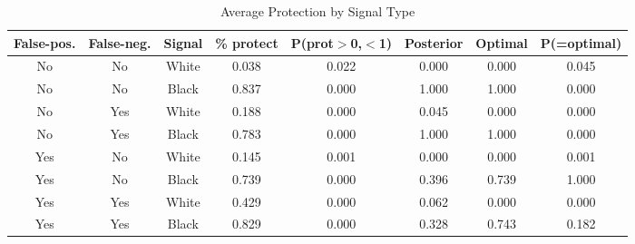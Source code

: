 \begin{table}[H]\centering \footnotesize \caption{Average Protection by Signal Type} \begin{tabular}{cccccccc} \hline \hline
\textbf{False-pos.}&\textbf{False-neg.}&\textbf{Signal}&\textbf{\% protect}& \textbf{P(prot$>$0,$<$1)}& \textbf{Posterior} & \textbf{Optimal} & \textbf{P(=optimal)} \\ \hline
No&No&White&0.038&0.022&0.000&0.000&0.045\\
No&No&Black&0.837&0.000&1.000&1.000&0.000\\
No&Yes&White&0.188&0.000&0.045&0.000&0.000\\
No&Yes&Black&0.783&0.000&1.000&1.000&0.000\\
Yes&No&White&0.145&0.001&0.000&0.000&0.001\\
Yes&No&Black&0.739&0.000&0.396&0.739&1.000\\
Yes&Yes&White&0.429&0.000&0.062&0.000&0.000\\
Yes&Yes&Black&0.829&0.000&0.328&0.743&0.182\\
\hline \end{tabular} \end{table}
